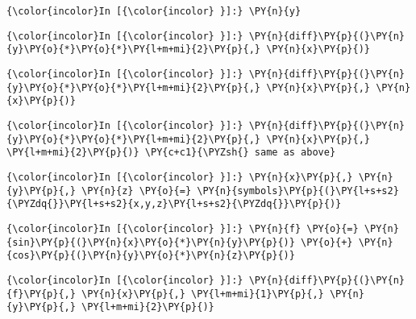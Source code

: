     \begin{Verbatim}[commandchars=\\\{\}]
{\color{incolor}In [{\color{incolor} }]:} \PY{n}{y}
\end{Verbatim}

    \begin{Verbatim}[commandchars=\\\{\}]
{\color{incolor}In [{\color{incolor} }]:} \PY{n}{diff}\PY{p}{(}\PY{n}{y}\PY{o}{*}\PY{o}{*}\PY{l+m+mi}{2}\PY{p}{,} \PY{n}{x}\PY{p}{)}
\end{Verbatim}



    \begin{Verbatim}[commandchars=\\\{\}]
{\color{incolor}In [{\color{incolor} }]:} \PY{n}{diff}\PY{p}{(}\PY{n}{y}\PY{o}{*}\PY{o}{*}\PY{l+m+mi}{2}\PY{p}{,} \PY{n}{x}\PY{p}{,} \PY{n}{x}\PY{p}{)}
\end{Verbatim}

    \begin{Verbatim}[commandchars=\\\{\}]
{\color{incolor}In [{\color{incolor} }]:} \PY{n}{diff}\PY{p}{(}\PY{n}{y}\PY{o}{*}\PY{o}{*}\PY{l+m+mi}{2}\PY{p}{,} \PY{n}{x}\PY{p}{,} \PY{l+m+mi}{2}\PY{p}{)} \PY{c+c1}{\PYZsh{} same as above}
\end{Verbatim}



    \begin{Verbatim}[commandchars=\\\{\}]
{\color{incolor}In [{\color{incolor} }]:} \PY{n}{x}\PY{p}{,} \PY{n}{y}\PY{p}{,} \PY{n}{z} \PY{o}{=} \PY{n}{symbols}\PY{p}{(}\PY{l+s+s2}{\PYZdq{}}\PY{l+s+s2}{x,y,z}\PY{l+s+s2}{\PYZdq{}}\PY{p}{)}
\end{Verbatim}

    \begin{Verbatim}[commandchars=\\\{\}]
{\color{incolor}In [{\color{incolor} }]:} \PY{n}{f} \PY{o}{=} \PY{n}{sin}\PY{p}{(}\PY{n}{x}\PY{o}{*}\PY{n}{y}\PY{p}{)} \PY{o}{+} \PY{n}{cos}\PY{p}{(}\PY{n}{y}\PY{o}{*}\PY{n}{z}\PY{p}{)}
\end{Verbatim}



    \begin{Verbatim}[commandchars=\\\{\}]
{\color{incolor}In [{\color{incolor} }]:} \PY{n}{diff}\PY{p}{(}\PY{n}{f}\PY{p}{,} \PY{n}{x}\PY{p}{,} \PY{l+m+mi}{1}\PY{p}{,} \PY{n}{y}\PY{p}{,} \PY{l+m+mi}{2}\PY{p}{)}
\end{Verbatim}





